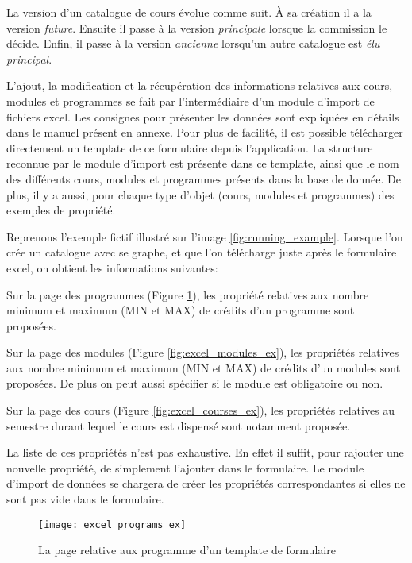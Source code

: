 \label{catalog_version}
La version d'un catalogue de cours évolue comme suit. À sa création il a la version \textit{future}. Ensuite il passe à la version \textit{principale} lorsque la commission le décide. Enfin, il passe à la version \textit{ancienne} lorsqu'un autre catalogue est \textit{élu} \textit{principal}. 

L'ajout, la modification et la récupération des informations relatives aux cours, modules et programmes se fait par l'intermédiaire d'un module d'import de fichiers excel. Les consignes pour présenter les données sont expliquées en détails dans le manuel présent en annexe. Pour plus de facilité, il est possible télécharger directement un template de ce formulaire depuis l'application. La structure reconnue par le module d'import est présente dans ce template, ainsi que le nom des différents cours, modules et programmes présents dans la base de donnée. De plus, il y a aussi, pour chaque type d'objet (cours, modules et programmes) des exemples de propriété. 

Reprenons l'exemple fictif illustré sur l'image \ref{fig:running_example}. Lorsque l'on crée un catalogue avec se graphe, et que l'on télécharge juste après le formulaire excel, on obtient les informations suivantes:

Sur la page des programmes (Figure \ref{fig:excel_programs_ex}), les propriété relatives aux nombre minimum et maximum (MIN et MAX) de crédits d'un programme sont proposées.

Sur la page des modules (Figure \ref{fig:excel_modules_ex}), les propriétés relatives aux nombre minimum et maximum (MIN et MAX) de crédits d'un modules sont proposées. De plus on peut aussi spécifier si le module est obligatoire ou non.

Sur la page des cours (Figure \ref{fig:excel_courses_ex}), les propriétés relatives au semestre durant lequel le cours est dispensé sont notamment proposée. 

La liste de ces propriétés n'est pas exhaustive. En effet il suffit, pour rajouter une nouvelle propriété, de simplement l'ajouter dans le formulaire. Le module d'import de données se chargera de créer les propriétés correspondantes si elles ne sont pas vide dans le formulaire. 

\begin{figure}
\centering
\caption{La page relative aux programme d'un template de formulaire}
\label{fig:excel_programs_ex}
\texttt{[image: excel\_programs\_ex]}
\end{figure}

